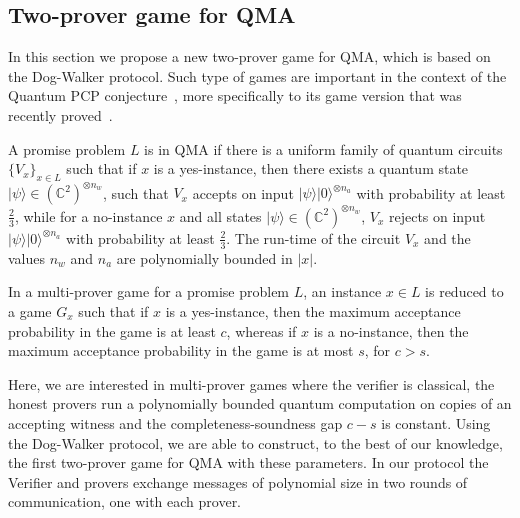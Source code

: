 \documentclass[11pt]{article}
\numberwithin{equation}{section}
\theoremstyle{definition}
\theoremstyle{plain}
\newcommand{\C}{\mathbb C}
\newcommand{\ket}[1]{|#1\rangle}
\begin{document}
%


\subsection{Two-prover game for QMA}\label{sec:qma}

In this section we propose a new two-prover game for QMA, which is based on the Dog-Walker
protocol. Such type of games are important in the context of the Quantum PCP conjecture~\cite{AharonovAV13}, more specifically to its game version that was recently proved~\cite{NatarajanV18}.


A promise problem $L$ is in QMA if there is a uniform family
of quantum circuits $\{V_x\}_{x \in L}$ such that if $x$ is a yes-instance, then there exists a
quantum state $\ket{\psi} \in \left(\C^2\right)^{\otimes n_w}$, such that
$V_x$  accepts on input $\ket{\psi}\ket{0}^{\otimes n_a}$ with probability at least
$\frac{2}{3}$, while for a no-instance $x$ and  all states $\ket{\psi} \in
\left(\C^2\right)^{\otimes n_w}$, $V_x$
rejects on input $\ket{\psi}\ket{0}^{\otimes n_a}$ with probability at
least $\frac{2}{3}$. The run-time of the circuit $V_x$ and the values $n_w$ and $n_a$ are polynomially bounded in $|x|$.

 In a multi-prover game for a promise problem $L$, an
 instance $x \in L$ is reduced to a game $G_x$ such that if $x$ is a yes-instance, then the maximum
 acceptance probability in the game is at least $c$, whereas if $x$ is a
 no-instance,
 then the maximum acceptance probability in the game is  at most $s$, for $c
 > s$.

Here, we are interested in multi-prover games where the verifier is classical,
 the honest provers run a polynomially bounded quantum computation on copies
 of an accepting witness and the completeness-soundness gap $c-s$ is constant.
Using the Dog-Walker protocol, we are able to construct, to the best of our knowledge, the first two-prover
game for QMA with these parameters. In our protocol the Verifier and provers exchange messages of polynomial size 
in two rounds of communication, one with each prover.
\end{document}
